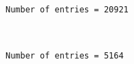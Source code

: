 \documentclass[11pt]{article}
\begin{document}
    \begin{Verbatim}[commandchars=\\\{\}]
Number of entries = 20921

    \end{Verbatim}

    \begin{center}
    \end{center}
    { \hspace*{\fill} \\}
    
    \begin{Verbatim}[commandchars=\\\{\}]
Number of entries = 5164

    \end{Verbatim}


    
    
    
    
\end{document}
